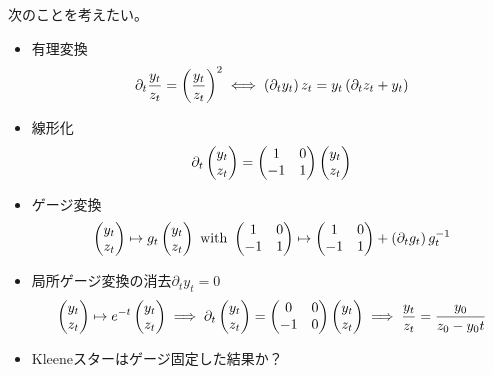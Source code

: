 {	\begin{todo}[有理変換とゲージ変換]\label{todo:有理変換とゲージ変換} %
		次のことを考えたい。
		\begin{itemize}\setlength{\itemsep}{-1mm} %
			\item 有理変換
			\begin{equation*}\begin{split}
				\partial_t\frac{y_t}{z_t} = \left({\frac{y_t}{z_t}}\right)^2 
				\iff \left({\partial_ty_t}\right)z_t = y_t\left({\partial_tz_t + y_t}\right)
			\end{split}\end{equation*}
			\item 線形化
			\begin{equation*}\begin{split}
				\partial_t\begin{pmatrix}{y_t}\\{z_t}\end{pmatrix} = \begin{pmatrix}
					1 & 0 \\ -1 & 1
				\end{pmatrix}\begin{pmatrix}{y_t}\\{z_t}\end{pmatrix}
			\end{split}\end{equation*}
			\item ゲージ変換
			\begin{equation*}\begin{split}
				\begin{pmatrix}{y_t}\\{z_t}\end{pmatrix} \mapsto g_t\begin{pmatrix}{y_t}\\{z_t}\end{pmatrix} \text{ with } 
				\begin{pmatrix}
					1 & 0 \\ -1 & 1
				\end{pmatrix} \mapsto \begin{pmatrix}
					1 & 0 \\ -1 & 1
				\end{pmatrix} + \left({\partial_tg_t}\right)g_t^{-1}
			\end{split}\end{equation*}
			\item 局所ゲージ変換の消去$\partial_ty_t=0$
			\begin{equation*}\begin{split}
				\begin{pmatrix}{y_t}\\{z_t}\end{pmatrix} \mapsto e^{-t}\begin{pmatrix}{y_t}\\{z_t}\end{pmatrix} 
				\implies \partial_t\begin{pmatrix}{y_t}\\{z_t}\end{pmatrix} = \begin{pmatrix}
					0 & 0 \\ -1 & 0
				\end{pmatrix}\begin{pmatrix}{y_t}\\{z_t}\end{pmatrix}
				\implies \frac{y_t}{z_t} = \frac{y_0}{z_0 - y_0t}
			\end{split}\end{equation*}
			\item Kleeneスターはゲージ固定した結果か？
			\begin{equation*}\begin{split}

\end{split}
\end{equation*}
\end{itemize}
\end{todo}}
